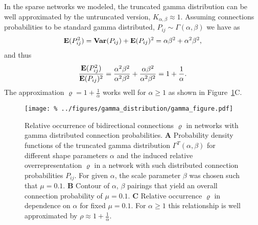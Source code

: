 In the sparse networks we modeled, the truncated gamma distribution
can be well approximated by the untruncated version, $K_{\alpha,
  \beta} \approx 1$. Assuming connections probabilities to be standard
gamma distributed, $P_{ij} \sim \Gamma(\alpha,\beta)$ we have
as
\begin{align}
  \operatorname{\mathbf{E}}(P_{ij}^2) = \operatorname{\mathbf{Var}}(P_{ij}) + \operatorname{\mathbf{E}}(P_{ij})^2 =  \alpha \beta^2 + \alpha^2 \beta^2, 
\end{align}
and thus
\begin{align}
  \frac{\operatorname{\mathbf{E}}(P_{ij}^2)}{\operatorname{\mathbf{E}}(P_{ij})^2} = \frac{\alpha^2 \beta^2}{\alpha^2 \beta^2} + \frac{\alpha \beta^2}{\alpha^2 \beta^2} =
 1 + \frac{1}{\alpha}.
\end{align}
The approximation $\varrho = 1 + \frac{1}{\alpha}$ works well for
$\alpha \geq 1$ as shown in Figure~\ref{fig:gd}C.




\begin{figure}[h!]
\centering
\texttt{[image: \%
  ../figures/gamma\_distribution/gamma\_figure.pdf]}
\caption{Relative occurrence of bidirectional connections $\varrho$ in
  networks with gamma distributed connection probabilities. \textbf{A}
  Probability density functions of the truncated gamma distribution
  $\Gamma^T(\alpha,\beta)$ for different shape parameters $\alpha$ and
  the induced relative overrepresentation $\varrho$ in a network with
  such distributed connection probabilities $P_{ij}$. For given
  $\alpha$, the scale parameter $\beta$ was chosen such that $\mu =
  0.1$. \textbf{B} Contour of $\alpha$, $\beta$ pairings that yield an
  overall connection probability of $\mu = 0.1$. \textbf{C} Relative
  occurrence $\varrho$ in dependence on $\alpha$ for fixed $\mu =
  0.1$. For $\alpha \geq 1$ this relationship is well approximated by
  $\rho \approx 1 + \frac{1}{\alpha}$.}
\label{fig:gd}
\end{figure}


